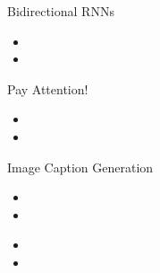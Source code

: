 \documentclass[xcolor=pdftex,x11names,table,hyperref]{beamer}
\begin{document}


\begin{frame}{Bidirectional RNNs}
\begin{itemize}
	\item 
	\item 
\end{itemize}
\end{frame}


\begin{frame}{Pay Attention!}
\begin{itemize}
	\item 
	\item 
\end{itemize}
\end{frame}



\begin{frame}{Image Caption Generation}
\begin{itemize}
	\item 
	\item 
\end{itemize}
\end{frame}




\begin{frame}{}
\begin{itemize}
	\item 
	\item 
\end{itemize}
\end{frame}





\end{document}

